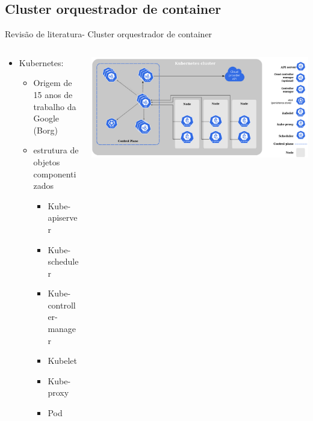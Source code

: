 \documentclass[10pt,brazil]{beamer}
\theoremstyle{definition}
\begin{document}
\subsection{Cluster orquestrador de container}

\begin{frame}{Revisão de literatura- Cluster orquestrador de container}
  \begin{columns}
    \begin{column}{0.5\textwidth}
      \begin{itemize}
        \item Kubernetes\textregistered:
              \begin{itemize}
                \item Origem de 15 anos de trabalho da Google (Borg) %
                \item estrutura de objetos componentizados %
                      \begin{itemize}
                        \item Kube-apiserver
                        \item Kube-scheduler
                        \item Kube-controller-manager
                        \item Kubelet
                        \item Kube-proxy
                        \item Pod
                      \end{itemize}
              \end{itemize}
      \end{itemize}
    \end{column}
    \begin{column}{0.5\textwidth}  %
      \begin{center}
        \includegraphics[width=1\textwidth]{kubeadm-node.png}
      \end{center}
    \end{column}
  \end{columns}
\end{frame}
\end{document}
